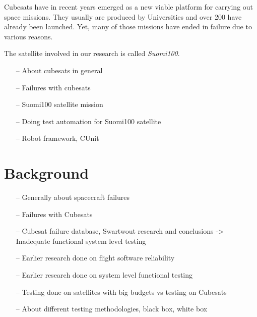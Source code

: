 \documentclass[english,12pt,a4paper,pdftex,elec,utf8]{aaltothesis}
\begin{document}
\thispagestyle{empty}

Cubesats have in recent years emerged as a new viable platform for carrying out space missions. They usually are produced by Universities and over 200 have already been launched. Yet, many of those missions have ended in failure due to various reasons.\par 
The satellite involved in our research is called \textit{Suomi100}.



\begin{itemize}
\item[--]About cubesats in general
\item[--]Failures with cubesats
\item[--]Suomi100 satellite mission
\item[--]Doing test automation for Suomi100 satellite
\item[--]Robot framework, CUnit
\end{itemize}


\clearpage

\section{Background}

\begin{itemize}
\item[--]Generally about spacecraft failures
\item[--]Failures with Cubesats
\item[--]Cubesat failure database, Swartwout research and conclusions -> Inadequate functional system level testing
\item[--]Earlier research done on flight software reliability
\item[--]Earlier research done on system level functional testing
\item[--]Testing done on satellites with big budgets vs testing on Cubesats
\item[--]About different testing methodologies, black box, white box
\end{itemize}
\end{document}
